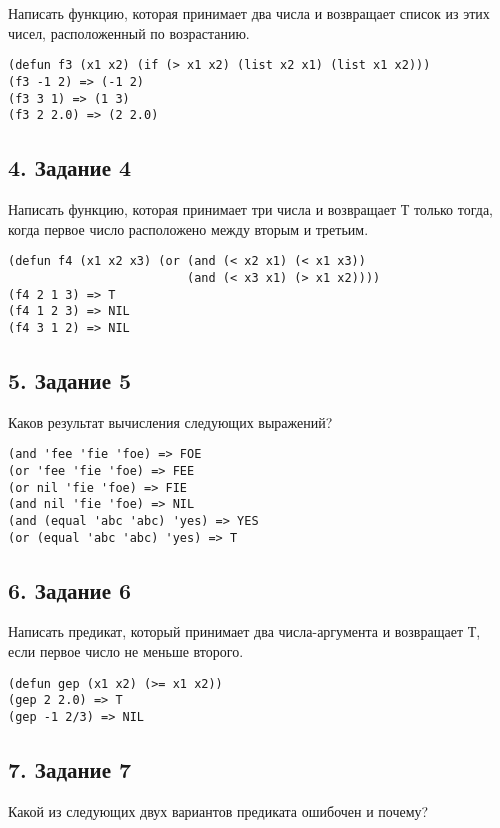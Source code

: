 Написать функцию, которая принимает два числа и возвращает список из этих чисел, расположенный по возрастанию.

\begin{lstlisting}
(defun f3 (x1 x2) (if (> x1 x2) (list x2 x1) (list x1 x2)))
(f3 -1 2) => (-1 2)
(f3 3 1) => (1 3)
(f3 2 2.0) => (2 2.0)
\end{lstlisting}

\subsection*{4. Задание 4}

Написать функцию, которая принимает три числа и возвращает Т только тогда, когда первое число расположено между вторым и третьим.
\begin{lstlisting}
(defun f4 (x1 x2 x3) (or (and (< x2 x1) (< x1 x3)) 
						 (and (< x3 x1) (> x1 x2))))
(f4 2 1 3) => T
(f4 1 2 3) => NIL
(f4 3 1 2) => NIL
\end{lstlisting}

\subsection*{5. Задание 5}

Каков результат вычисления следующих выражений?

\begin{lstlisting}
(and 'fee 'fie 'foe) => FOE
(or 'fee 'fie 'foe) => FEE
(or nil 'fie 'foe) => FIE
(and nil 'fie 'foe) => NIL
(and (equal 'abc 'abc) 'yes) => YES
(or (equal 'abc 'abc) 'yes) => T
\end{lstlisting}

\subsection*{6. Задание 6}

Написать предикат, который принимает два числа-аргумента и возвращает Т, если первое число не меньше второго.

\begin{lstlisting}
(defun gep (x1 x2) (>= x1 x2))
(gep 2 2.0) => T
(gep -1 2/3) => NIL
\end{lstlisting}

\subsection*{7. Задание 7}

Какой из следующих двух вариантов предиката ошибочен и почему?

